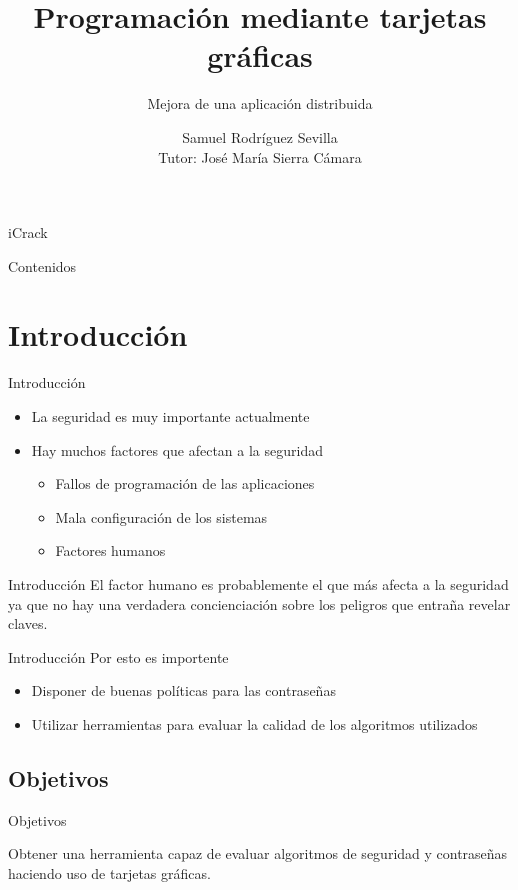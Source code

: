\documentclass[12pt,hyperref={pdfpagelabels=false}]{beamer}
\title{Programación mediante tarjetas gráficas}
\subtitle{Mejora de una aplicación distribuida}
\author{Samuel Rodríguez Sevilla\\Tutor: José María Sierra Cámara}
\begin{document}
\frame{\titlepage}

\begin{frame}
	\begin{center}
		\Huge iCrack
	\end{center}
\end{frame}


\begin{frame}{Contenidos}
	\tableofcontents[pausesections]
\end{frame}

\section{Introducción}
\begin{frame}{Introducción}
	\begin{itemize}
		\item La seguridad es muy importante actualmente
		\item Hay muchos factores que afectan a la seguridad
		\begin{itemize}
			\item Fallos de programación de las aplicaciones
			\item Mala configuración de los sistemas
			\item Factores humanos
		\end{itemize}
	\end{itemize}
\end{frame}

\begin{frame}{Introducción}
	El factor humano es probablemente el que más afecta a la seguridad ya que no hay una verdadera concienciación sobre los peligros que entraña revelar claves.

\end{frame}

\begin{frame}{Introducción}
	Por esto es importente
	\pause
	\begin{itemize}
		\item Disponer de buenas políticas para las contraseñas
		\item Utilizar herramientas para evaluar la calidad de los algoritmos utilizados
	\end{itemize}
\end{frame}

\subsection{Objetivos}
\begin{frame}{Objetivos}
	\begin{center}
		Obtener una herramienta capaz de evaluar algoritmos de seguridad y contraseñas haciendo uso de tarjetas gráficas.
	\end{center}
\end{frame}
\end{document}
